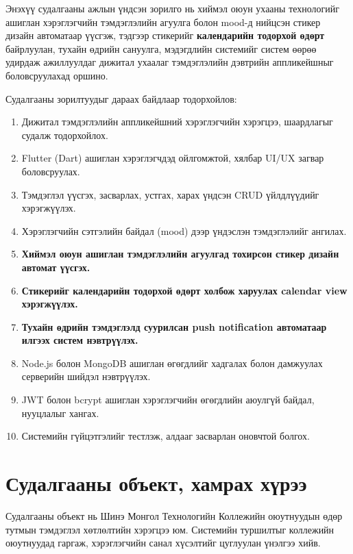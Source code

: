 Энэхүү судалгааны ажлын үндсэн зорилго нь хиймэл оюун ухааны технологийг ашиглан
хэрэглэгчийн тэмдэглэлийн агуулга болон mood-д нийцсэн стикер дизайн автоматаар
үүсгэж, тэдгээр стикерийг \textbf{календарийн тодорхой өдөрт} байрлуулан, тухайн
өдрийн сануулга, мэдэгдлийн системийг систем өөрөө удирдаж ажиллуулдаг дижитал
ухаалаг тэмдэглэлийн дэвтрийн аппликейшныг боловсруулахад оршино.

Судалгааны зорилтуудыг дараах байдлаар тодорхойлов:

\begin{enumerate}
  \item Дижитал тэмдэглэлийн аппликейшний хэрэглэгчийн хэрэгцээ, шаардлагыг судалж тодорхойлох.
  \item Flutter (Dart) ашиглан хэрэглэгчдэд ойлгомжтой, хялбар UI/UX загвар боловсруулах.
  \item Тэмдэглэл үүсгэх, засварлах, устгах, харах үндсэн CRUD үйлдлүүдийг хэрэгжүүлэх.
  \item Хэрэглэгчийн сэтгэлийн байдал (mood) дээр үндэслэн тэмдэглэлийг ангилах.
  \item \textbf{Хиймэл оюун ашиглан тэмдэглэлийн агуулгад тохирсон стикер дизайн автомат үүсгэх.}
  \item \textbf{Стикерийг календарийн тодорхой өдөрт холбож харуулах calendar view хэрэгжүүлэх.}
  \item \textbf{Тухайн өдрийн тэмдэглэлд суурилсан push notification автоматаар илгээх систем нэвтрүүлэх.}
  \item Node.js болон MongoDB ашиглан өгөгдлийг хадгалах болон дамжуулах серверийн шийдэл нэвтрүүлэх.
  \item JWT болон bcrypt ашиглан хэрэглэгчийн өгөгдлийн аюулгүй байдал, нууцлалыг хангах.
  \item Системийн гүйцэтгэлийг тестлэж, алдааг засварлан оновчтой болгох.
\end{enumerate}

\section{Судалгааны объект, хамрах хүрээ}

Судалгааны объект нь Шинэ Монгол Технологийн Коллежийн оюутнуудын өдөр тутмын
тэмдэглэл хөтлөлтийн хэрэгцээ юм. Системийн туршилтыг коллежийн оюутнуудад
гаргаж, хэрэглэгчийн санал хүсэлтийг цуглуулан үнэлгээ хийв.

